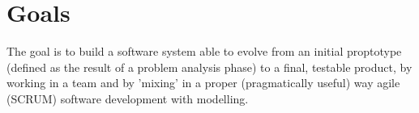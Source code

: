 \section{Goals}
The goal is to build a software system able to evolve from an initial proptotype (defined as the result of a problem analysis phase) to a final, testable product, by working in a team and by 'mixing' in a proper (pragmatically useful) way agile (SCRUM) software development with modelling.